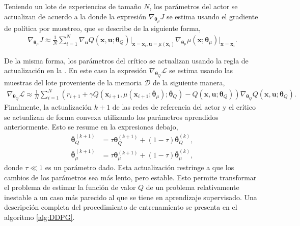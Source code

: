 Teniendo un lote de experiencias de tamaño $N$, los parámetros del actor se actualizan de acuerdo a la  donde la expresión $\nabla_{\bm\theta_{\mu}}J$ se estima usando el gradiente de política por muestreo, que se describe de la siguiente forma,
\begin{align}
\nabla_{\bm\theta_{\mu}} J \approx \frac{1}{N}\sum_{i=1}^{N} \nabla_{\mathbf{u}}Q(\mathbf{x},\mathbf{u};\bm\theta_{Q})\Big|_{\mathbf{x}=\mathbf{x}_i, \mathbf{u}= \mu(\mathbf{x}_i)} \nabla_{\bm\theta_{\mu}}\mu(\mathbf{x};\bm\theta_{\mu})\Big |_{\mathbf{x}=\mathbf{x}_i}.
\label{eq:actor_grad}
\end{align}

De la misma forma, los parámetros del crítico se actualizan usando la regla de actualización en la . En este caso la expresión $\nabla_{\bm\theta_{Q}}\mathcal{L}$ se estima usando las muestras del lote proveniente de la memoria $\mathcal{D}$ de la siguiente manera,
\begin{align}
\nabla_{\bm\theta_{Q}}\mathcal{L} \approx \frac{1}{N}\sum_{i=1}^{N}\left(r_{i+1} + \gamma Q\left(\mathbf{x}_{i+1},\mu(\mathbf{x}_{i+1};\bar{\bm\theta}_{\mu});\bar{\bm{\theta}}_{Q}\right)-Q\left(\mathbf{x}, \mathbf{u};\bm{\theta}_{Q}\right)\right)\nabla_{\bm\theta_Q}Q(\mathbf{x}, \mathbf{u};\bm\theta_Q).
\label{eq:critic_grad}
\end{align}
Finalmente, la actualización $k+1$ de las redes de referencia del actor y el crítico se actualizan de forma convexa utilizando los parámetros aprendidos anteriormente. Esto se resume en la expresiones debajo, 
\begin{align}
    \bar{\bm\theta}_{Q}^{(k+1)} &= \tau \bm\theta_{Q}^{(k+1)} +(1- \tau)\bar{\bm\theta}_{Q}^{(k)}, \\
    \bar{\bm\theta}_{\mu}^{(k+1)} &= \tau \bm\theta_{\mu}^{(k+1)} +(1- \tau)\bar{\bm\theta}_{\mu}^{(k)},
\end{align}
donde $\tau \ll 1$ es un parámetro dado. Esta actualización restringe a que los cambios de los parámetros sea más lento, pero estable. Esto permite transformar el problema de estimar la función de valor $Q$ de un problema relativamente inestable a un caso más parecido al que se tiene en aprendizaje supervisado. \cite{lillicrap2015continuous} Una descripción completa del procedimiento de entrenamiento se presenta en el algoritmo \ref{alg:DDPG}.
